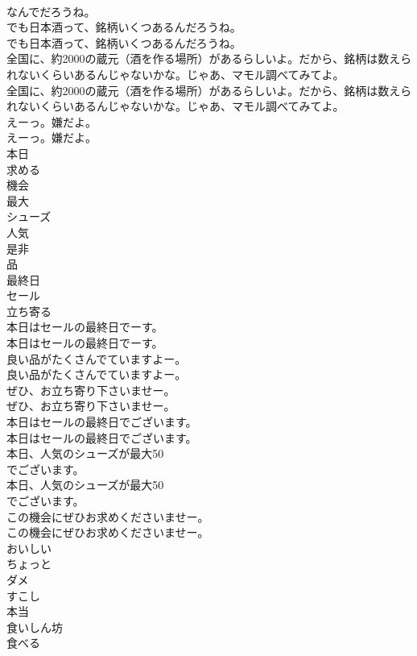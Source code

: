 \documentclass[8pt]{extreport}
\begin{document}
\begin{CJK}{UTF8}{min}
\\	なんでだろうね。 
\\	でも日本酒って、銘柄いくつあるんだろうね。	
\\	でも日本酒って、銘柄いくつあるんだろうね。 
\\	全国に、約2000の蔵元（酒を作る場所）があるらしいよ。だから、銘柄は数えられないくらいあるんじゃないかな。じゃあ、マモル調べてみてよ。	
\\	全国に、約2000の蔵元（酒を作る場所）があるらしいよ。だから、銘柄は数えられないくらいあるんじゃないかな。じゃあ、マモル調べてみてよ。 
\\	えーっ。嫌だよ。	
\\	えーっ。嫌だよ。 
\\	本日
\\	求める
\\	機会
\\	最大
\\	シューズ
\\	人気
\\	是非
\\	品
\\	最終日
\\	セール
\\	立ち寄る
\\	本日はセールの最終日でーす。	
\\	本日はセールの最終日でーす。 
\\	良い品がたくさんでていますよー。	
\\	良い品がたくさんでていますよー。 
\\	ぜひ、お立ち寄り下さいませー。	
\\	ぜひ、お立ち寄り下さいませー。 
\\	本日はセールの最終日でございます。	
\\	本日はセールの最終日でございます。 
\\	本日、人気のシューズが最大50
\\	でございます。	
\\	本日、人気のシューズが最大50
\\	でございます。 
\\	この機会にぜひお求めくださいませー。	
\\	この機会にぜひお求めくださいませー。 
\\	おいしい
\\	ちょっと
\\	ダメ
\\	すこし
\\	本当
\\	食いしん坊
\\	食べる

\end{CJK}
\end{document}
